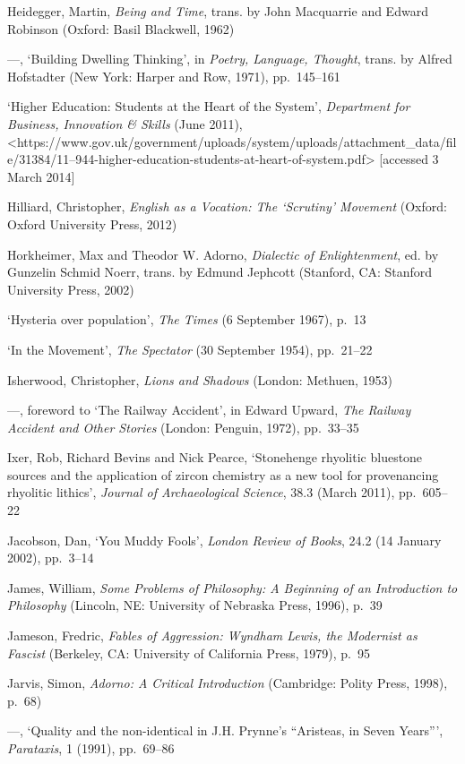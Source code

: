 \documentclass[]{article}
\begin{document}
Heidegger, Martin, \emph{Being and Time}, trans. by John Macquarrie and
Edward Robinson (Oxford: Basil Blackwell, 1962)

—, ‘Building Dwelling Thinking’, in \emph{Poetry, Language, Thought},
trans. by Alfred Hofstadter (New York: Harper and Row, 1971),
pp.~145–161

‘Higher Education: Students at the Heart of the System’,
\emph{Department for Business, Innovation \& Skills} (June 2011),\\
\textless{}https://www.gov.uk/government/uploads/system/uploads/attachment\_data/file/31384/11–944-higher-education-students-at-heart-of-system.pdf\textgreater{}
{[}accessed 3 March 2014{]}

Hilliard, Christopher, \emph{English as a Vocation: The ‘Scrutiny’
Movement} (Oxford: Oxford University Press, 2012)

Horkheimer, Max and Theodor W. Adorno, \emph{Dialectic of
Enlightenment}, ed. by Gunzelin Schmid Noerr, trans. by Edmund Jephcott
(Stanford, CA: Stanford University Press, 2002)

‘Hysteria over population’, \emph{The Times} (6 September 1967), p.~13

‘In the Movement’, \emph{The Spectator} (30 September 1954), pp.~21–22

Isherwood, Christopher, \emph{Lions and Shadows} (London: Methuen, 1953)

—, foreword to ‘The Railway Accident’, in Edward Upward, \emph{The
Railway Accident and Other Stories} (London: Penguin, 1972), pp.~33–35

Ixer, Rob, Richard Bevins and Nick Pearce, ‘Stonehenge rhyolitic
bluestone sources and the application of zircon chemistry as a new tool
for provenancing rhyolitic lithics’, \emph{Journal of Archaeological
Science}, 38.3 (March 2011), pp.~605–22

Jacobson, Dan, ‘You Muddy Fools’, \emph{London Review of Books}, 24.2
(14 January 2002), pp.~3–14

James, William, \emph{Some Problems of Philosophy: A Beginning of an
Introduction to Philosophy} (Lincoln, NE: University of Nebraska Press,
1996), p.~39

Jameson, Fredric, \emph{Fables of Aggression: Wyndham Lewis, the
Modernist as Fascist} (Berkeley, CA: University of California Press,
1979), p.~95

Jarvis, Simon, \emph{Adorno: A Critical Introduction} (Cambridge: Polity
Press, 1998), p.~68)

—, ‘Quality and the non-identical in J.H. Prynne’s “Aristeas, in Seven
Years”’, \emph{Parataxis}, 1 (1991), pp.~69–86
\end{document}
